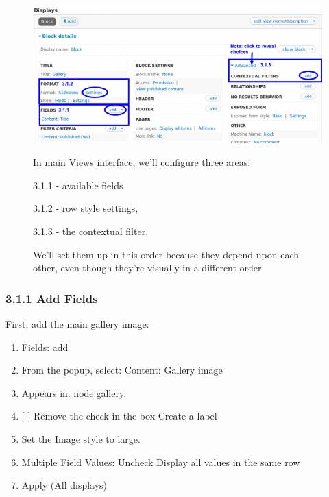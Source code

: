 \documentclass[letterpaper,10pt,english]{sphinxmanual}
\begin{document}
\begin{figure}[htbp]
\centering

\includegraphics{slideshow-3.1-main.png}
{\small 
In main Views interface, we'll configure three areas:

\begin{DUlineblock}{0em}
\item[] 3.1.1 - available fields
\item[] 3.1.2 - row style settings,
\item[] 3.1.3 - the contextual filter.
\end{DUlineblock}

We’ll set them up in this order because they depend upon each other, even though they’re visually in a different order.
}\end{figure}


\subsubsection{3.1.1 Add Fields}
\label{recipe:add-fields}
First, add the main gallery image:
\begin{enumerate}
\item {} 
Fields: add

\item {} 
From the popup, select: Content: Gallery image

\item {} 
Appears in: node:gallery.

\item {} 
{[}  {]} Remove the check in the box Create a label

\item {} 
Set the Image style to large.

\item {} 
Multiple Field Values: Uncheck Display all values in the same row

\item {} 
Apply (All displays)

\end{enumerate}
\end{document}
